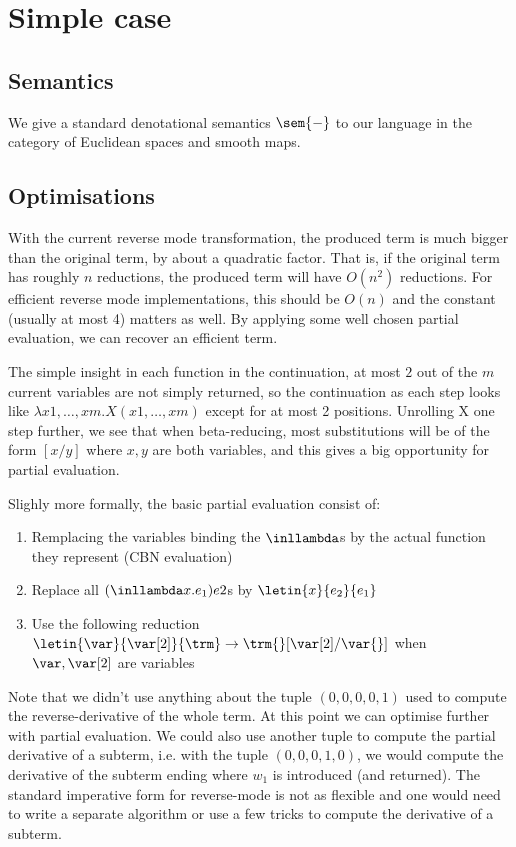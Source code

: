 \section{Simple case}

\subsection{Semantics} 
\label{sub:Semantics}

We give a standard denotational semantics $\sem{-}$ to our language in the category of Euclidean spaces and smooth maps.

\subsection{Optimisations}

With the current reverse mode transformation, the produced term is much bigger than the original term, by about a quadratic factor. 
That is, if the original term has roughly $n$ reductions, the produced term will have $O(n^2)$ reductions. 
For efficient reverse mode implementations, this should be $O(n)$ and the constant (usually at most 4) matters as well.
By applying some well chosen partial evaluation, we can recover an efficient term.

The simple insight in each function in the continuation, at most $2$ out of the $m$ current variables are not simply returned, so the continuation as each step looks like
$\lambda x1,\ldots,xm.X(x1,\ldots,xm)$ except for at most 2 positions.
Unrolling X one step further, we see that when beta-reducing, most substitutions will be of the form $[x/y]$ where $x,y$ are both variables, 
and this gives a big opportunity for partial evaluation.

Slighly more formally, the basic partial evaluation consist of:
\begin{enumerate}
	\item Remplacing the variables binding the $\inllambda$s by the actual function they represent (CBN evaluation)
	\item Replace all $(\inllambda x.e_1)e2$s by $\letin{x}{e_2}{e_1}$
	\item Use the following reduction $\letin{\var}{\var[2]}{\trm}\to\trm{}[\var[2]/\var{}]$ when $\var,\var[2]$ are variables
\end{enumerate}

Note that we didn't use anything about the tuple $(0,0,0,0,1)$ used to compute the reverse-derivative of the whole term. 
At this point we can optimise further with partial evaluation. We could also use another tuple to compute the partial derivative of a subterm, 
i.e. with the tuple $(0,0,0,1,0)$, we would compute the derivative of the subterm ending where $w_1$ is introduced (and returned). 
The standard imperative form for reverse-mode is not as flexible and one would need to write a separate algorithm 
or use a few tricks to compute the derivative of a subterm. 


